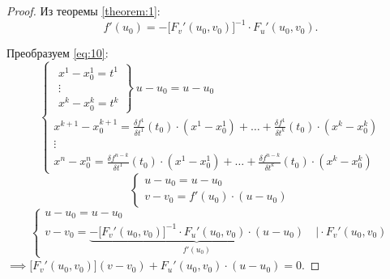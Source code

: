 \begin{proof}
    Из теоремы \ref{theorem:1}:
    \[
        f'(u_0) = -\big[F_v'(u_0,v_0)\big]^{-1} \cdot F_u'(u_0,v_0).
    \]

    Преобразуем \ref{eq:10}:
    \[
        \left\{\begin{array}{l}
            \left.\begin{array}{l}
                      x^1 - x_0^1 = t^1 \\
                      \vdots            \\
                      x^k - x_0^k = t^k
                  \end{array}\right\} \ u - u_0 = u - u_0                                                                                                \\
            x^{k+1} - x_0^{k+1} = \frac{\delta f^1}{\delta t^1}(t_0)\cdot (x^1 - x_0^1) + \ldots + \frac{\delta f^1}{\delta t^k}(t_0)\cdot (x^k - x_0^k) \\
            \vdots                                                                                                                                       \\
            x^n - x_0^n = \frac{\delta f^{n-k}}{\delta t^1}(t_0)\cdot (x^1 - x_0^1) + \ldots + \frac{\delta f^{n-k}}{\delta t^k}(t_0)\cdot (x^k - x_0^k)
        \end{array}\right.
    \]
    \[
        \left\{\begin{array}{l}
            u-u_0 = u-u_0 \\
            v-v_0 = f'(u_0) \cdot (u-u_0)
        \end{array}\right.
    \]
    \[
        \left\{\begin{array}{l}
            u-u_0 = u-u_0 \\
            v - v_0 = \underbrace{-\big[F_v'(u_0,v_0)\big]^{-1}\cdot F_u'(u_0,v_0)\cdot (u-u_0)}_{f'(u_0)} \quad \Big| \cdot F_v'(u_0,v_0)
        \end{array}\right.
    \]
    $ \implies \big[F_v'(u_0,v_0)\big](v-v_0) + F_u'(u_0,v_0)\cdot(u-u_0) = 0 $.
\end{proof}


